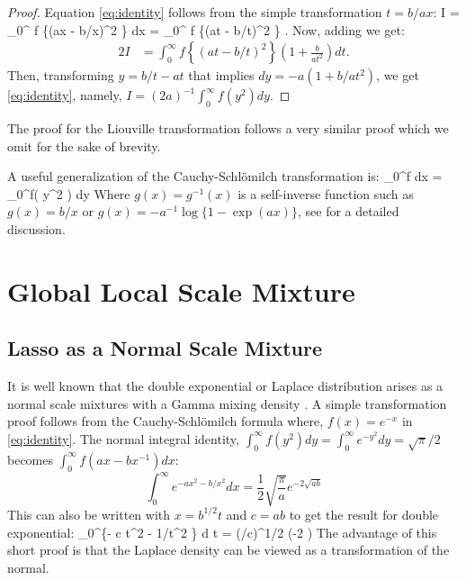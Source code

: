 \documentclass[lineno]{biometrika}
\def\CS{Cauchy-Schl\"omilch }
\begin{document}
\begin{proof}
Equation \eqref{eq:identity} follows from the simple transformation $t = b/ax$: 
\beq
I = \int_{0}^{\infty} f \left\{(ax - b/x)^2 \right\} dx = \int_{0}^{\infty} f \left\{(at - b/t)^2 \right\}  .\nonumber
\eeq
Now, adding we get: 
\begin{align*}
2 I & = \int_{0}^{\infty} f \left\{(at - b/t)^2 \right\} \left( 1+\frac{b}{at^2} \right) dt.
\end{align*}
Then, transforming $y = b/t - at$ that implies $dy = -a (1+b/at^2)$, we get \eqref{eq:identity}, namely, $I = (2a)^{-1} \int_{0}^{\infty} f(y^2) dy$. 
\end{proof}
The proof for the Liouville transformation follows a very similar proof which we omit for the sake of brevity. 

A useful generalization of the Cauchy-Schl\"omilch transformation is: 
\beq
\int_0^\infty f \left[ \{x-g(x)\}^2 \right] dx = \int_0^\infty f( y^2 ) dy \label{eq:gen}
\eeq 
Where $g(x)=g^{-1}(x)$ is a self-inverse function such as $g(x) = b/x$ or $g(x) = -a^{-1}\log\{1-\exp(a x)\}$, see \citep{jones2010distributions,jones2014generating} for a detailed discussion. %

\section{Global Local Scale Mixture}
\subsection{Lasso as a Normal Scale Mixture}
It is well known that the double exponential or Laplace distribution arises as a normal scale mixtures with a Gamma mixing density \citep{andrews1974scale}. A simple transformation proof follows from the \CS formula where, $ f(x) = e^{-x} $ in \eqref{eq:identity}. The normal integral identity, $ \int_{0}^{\infty} f(y^2) dy = \int_0^\infty e^{-y^2} d y = \sqrt{\pi}/2 $ becomes $\int_{0}^{\infty} f(ax-bx^{-1}) dx$:  
$$
\int_0^\infty e^{- a x^2 - b / x^2 } d x = \frac{1}{2} \sqrt{ \frac{\pi}{a}} e^{- 2 \sqrt{ab}}
$$
This can also be written with $ x = b^{1/2} t $ and $c = ab$ to get the \citet{andrews1974scale} result for double exponential: 
\beq
\int_0^\infty \exp \{- c t^2 - 1/t^2 \} d t = \half (\pi/c)^{1/2} \exp (-2 ) \label{eq:andrews}
\eeq
The advantage of this short proof is that the Laplace density can be viewed as a transformation of the normal. 
\end{document}
